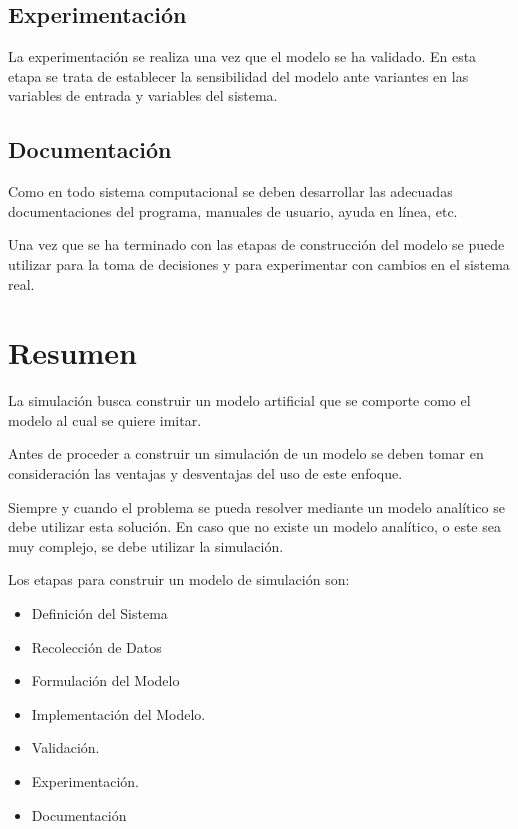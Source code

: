 \subsection{Experimentación}


La experimentación se realiza una vez que el modelo se ha validado. En esta etapa se trata de establecer la sensibilidad del modelo ante variantes en las variables de entrada y variables del sistema.


\subsection{Documentación}

Como en todo sistema computacional se deben desarrollar las adecuadas documentaciones del programa, manuales de usuario, ayuda en línea, etc.


Una vez que se ha terminado con las etapas de construcción del modelo se puede utilizar para la toma de decisiones y para experimentar con cambios en el sistema real.



\section{Resumen}


La simulación busca construir un modelo artificial que se comporte como el modelo al cual se quiere imitar. 

Antes de proceder a construir un simulación de un modelo se deben tomar en consideración las ventajas y desventajas del uso de este enfoque.

Siempre y cuando el problema se pueda resolver mediante un modelo analítico se debe utilizar esta solución. En caso que no existe un modelo analítico, o este sea muy complejo, se debe utilizar la simulación.

Los etapas para construir un modelo de simulación son:
\begin{itemize}
\item Definición del Sistema
\item Recolección de Datos
\item Formulación del Modelo
\item Implementación del Modelo.
\item Validación.
\item Experimentación.
\item Documentación
\end{itemize}


